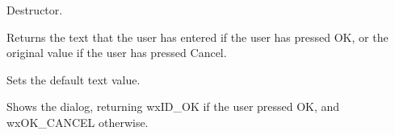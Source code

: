 Destructor.

\label{wxtextentrydialoggetvalue}


Returns the text that the user has entered if the user has pressed OK, or the original value
if the user has pressed Cancel.

\label{wxtextentrydialogsetvalue}


Sets the default text value.

\label{wxtextentrydialogshowmodal}


Shows the dialog, returning wxID\_OK if the user pressed OK, and wxOK\_CANCEL
otherwise.


